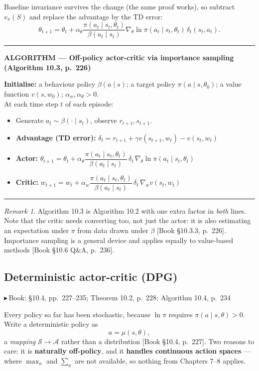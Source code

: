\documentclass[11pt, letterpaper]{article}
\theoremstyle{runin}
\theoremstyle{runinplain}
\theoremstyle{remark}
\newtheorem*{remark}{Remark}
\newcommand{\Sspace}{\mathcal{S}}
\newcommand{\Aspace}{\mathcal{A}}
\newcommand{\bk}[1]{{\color{bookblue}\small$\blacktriangleright$\,\textsf{Book: #1}}}
\newcommand{\bkin}[1]{{\color{bookblue}\small[\textsf{Book #1}]}}
\newenvironment{algobox}[1]
  {\par\medskip\noindent\rule{\textwidth}{0.9pt}\par\nobreak\vspace{0.25em}
   \noindent\textbf{\small ALGORITHM --- #1}\par\nobreak\vspace{0.15em}
   \small}
  {\par\nobreak\vspace{0.25em}\noindent\rule{\textwidth}{0.9pt}\par\medskip}
\begin{document}
Baseline invariance survives the change (the same proof works), so subtract
$v_\pi(S)$ and replace the advantage by the TD error:
\[
  \theta_{t+1}=\theta_t+\alpha_\theta\frac{\pi(a_t\mid s_t,\theta_t)}{\beta(a_t\mid s_t)}
    \nabla_\theta\ln\pi(a_t\mid s_t,\theta_t)\,\delta_t(s_t,a_t).
\]

\begin{algobox}{Off-policy actor-critic via importance sampling (Algorithm 10.3, p.~226)}
\textbf{Initialise:} a behaviour policy $\beta(a\mid s)$; a target policy
$\pi(a\mid s,\theta_0)$; a value function $v(s,w_0)$; $\alpha_w,\alpha_\theta>0$.\\
At each time step $t$ of each episode:
\begin{itemize}\itemsep0pt
  \item Generate $a_t\sim\beta(\cdot\mid s_t)$, observe $r_{t+1},s_{t+1}$.
  \item \textbf{Advantage (TD error):}
        $\delta_t=r_{t+1}+\gamma v(s_{t+1},w_t)-v(s_t,w_t)$
  \item \textbf{Actor:}
        $\theta_{t+1}=\theta_t+\alpha_\theta\dfrac{\pi(a_t\mid s_t,\theta_t)}{\beta(a_t\mid s_t)}\,\delta_t\,\nabla_\theta\ln\pi(a_t\mid s_t,\theta_t)$
  \item \textbf{Critic:}
        $w_{t+1}=w_t+\alpha_w\dfrac{\pi(a_t\mid s_t,\theta_t)}{\beta(a_t\mid s_t)}\,\delta_t\,\nabla_w v(s_t,w_t)$
\end{itemize}
\end{algobox}

\begin{remark}
Algorithm 10.3 is Algorithm 10.2 with one extra factor in \emph{both} lines. Note
that the critic needs converting too, not just the actor: it is also estimating an
expectation under $\pi$ from data drawn under $\beta$
\bkin{\S10.3.3, p.~226}. Importance sampling is a general device and applies equally
to value-based methods \bkin{\S10.6 Q\&A, p.~236}.
\end{remark}

\subsection{Deterministic actor-critic (DPG)}

\bk{\S10.4, pp.~227--235; Theorem 10.2, p.~228; Algorithm 10.4, p.~234}

Every policy so far has been stochastic, because $\ln\pi$ requires
$\pi(a\mid s,\theta)>0$. Write a deterministic policy as
\[
  a=\mu(s,\theta),
\]
a \emph{mapping} $\Sspace\to\Aspace$ rather than a distribution
\bkin{\S10.4, p.~227}. Two reasons to care: it is \textbf{naturally off-policy}, and
it \textbf{handles continuous action spaces} --- where $\max_a$ and $\sum_a$ are not
available, so nothing from Chapters 7--8 applies.
\end{document}
